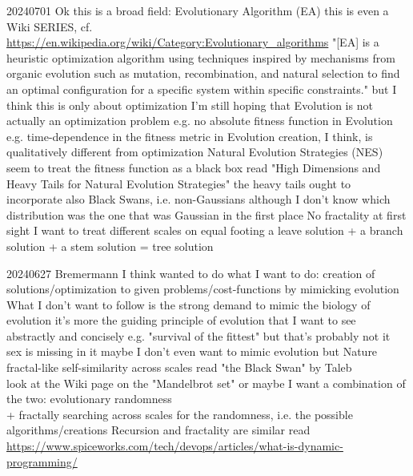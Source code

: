 \documentclass{article}\usepackage[margin=2cm]{geometry}
\begin{document}
\begin{cascade}
    20240701
    \stepin
    Ok this is a broad field: Evolutionary Algorithm (EA)
    \stepin
    this is even a Wiki SERIES, cf. \url{https://en.wikipedia.org/wiki/Category:Evolutionary_algorithms}
    \stepin
    "[EA] is a heuristic optimization algorithm using techniques inspired by mechanisms from organic evolution such as mutation, recombination, and natural selection to find an optimal configuration for a specific system within specific constraints."
    \stepout
    but I think this is only about optimization
    \stepin
    I'm still hoping that Evolution is not actually an optimization problem
    \stepin
    e.g. no absolute fitness function in Evolution\\
    e.g. time-dependence in the fitness metric in Evolution
    \stepout
    creation, I think, is qualitatively different from optimization
    \stepout
    Natural Evolution Strategies (NES) seem to treat the fitness function as a black box
    \stepin
    read "High Dimensions and Heavy Tails for Natural Evolution Strategies"
    \stepin
    the heavy tails ought to incorporate also Black Swans, i.e. non-Gaussians
    \stepin
    although I don't know which distribution was the one that was Gaussian in the first place
    \stepout
    \stepout
    \stepout
    No fractality at first sight
    \stepin
    I want to treat different scales on equal footing
    \stepin
    a leave solution + a branch solution + a stem solution = tree solution
\end{cascade}
\begin{cascade}
    20240627
    \stepin
    Bremermann I think wanted to do what I want to do: 
    \stepin
    creation of solutions/optimization to given problems/cost-functions by mimicking evolution
    \stepout
    What I don't want to follow is the strong demand to mimic the biology of evolution
    \stepin
    it's more the guiding principle of evolution that I want to see\\
    abstractly and concisely
    \stepin
    e.g. "survival of the fittest"
    \stepin
    but that's probably not it\\
    sex is missing in it
    \stepout
    \stepout
    maybe I don't even want to mimic evolution but Nature
    \stepin
    fractal-like self-similarity across scales
    \stepin
    read "the Black Swan" by Taleb\\
    look at the Wiki page on the "Mandelbrot set"
    \stepout
    \stepout
    or maybe I want a combination of the two:
    \stepin
    evolutionary randomness\\
    + fractally searching across scales
    \stepin
    for the randomness, i.e. the possible algorithms/creations
    \stepout
    \stepout
    \stepout
    Recursion and fractality are similar
    \stepin
    read \url{https://www.spiceworks.com/tech/devops/articles/what-is-dynamic-programming/}
\end{cascade}
\end{document}
